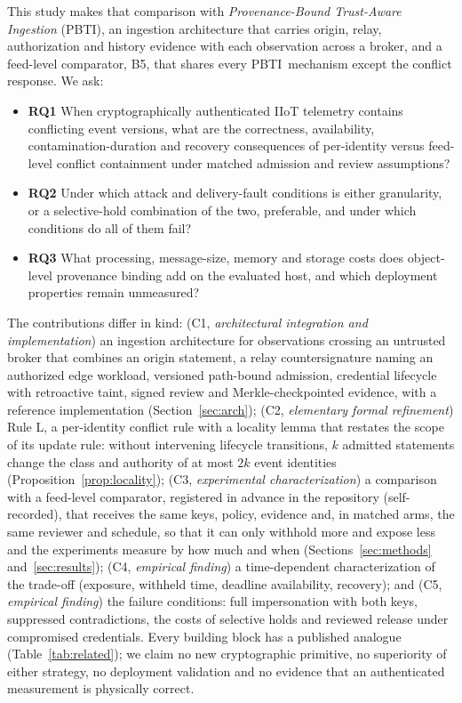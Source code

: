 \documentclass[futureinternet,article,submit,moreauthors]{Definitions/mdpi}
\newcommand{\sys}{PBTI}
\begin{document}
This study makes that comparison with \emph{Provenance-Bound Trust-Aware Ingestion} (\sys), an ingestion architecture that carries origin, relay, authorization and history evidence with each observation across a broker, and a feed-level comparator, B5, that shares every \sys\ mechanism except the conflict response. We ask:
\begin{itemize}
\item[] \textbf{RQ1} When cryptographically authenticated IIoT telemetry contains conflicting event versions, what are the correctness, availability, contamination-duration and recovery consequences of per-identity versus feed-level conflict containment under matched admission and review assumptions?
\item[] \textbf{RQ2} Under which attack and delivery-fault conditions is either granularity, or a selective-hold combination of the two, preferable, and under which conditions do all of them fail?
\item[] \textbf{RQ3} What processing, message-size, memory and storage costs does object-level provenance binding add on the evaluated host, and which deployment properties remain unmeasured?
\end{itemize}

The contributions differ in kind: (C1, \emph{architectural integration and implementation}) an ingestion architecture for observations crossing an untrusted broker that combines an origin statement, a relay countersignature naming an authorized edge workload, versioned path-bound admission, credential lifecycle with retroactive taint, signed review and Merkle-checkpointed evidence, with a reference implementation (Section~\ref{sec:arch}); (C2, \emph{elementary formal refinement}) Rule L, a per-identity conflict rule with a locality lemma that restates the scope of its update rule: without intervening lifecycle transitions, $k$ admitted statements change the class and authority of at most $2k$ event identities (Proposition~\ref{prop:locality}); (C3, \emph{experimental characterization}) a comparison with a feed-level comparator, registered in advance in the repository (self-recorded), that receives the same keys, policy, evidence and, in matched arms, the same reviewer and schedule, so that it can only withhold more and expose less and the experiments measure by how much and when (Sections~\ref{sec:methods} and~\ref{sec:results}); (C4, \emph{empirical finding}) a time-dependent characterization of the trade-off (exposure, withheld time, deadline availability, recovery); and (C5, \emph{empirical finding}) the failure conditions: full impersonation with both keys, suppressed contradictions, the costs of selective holds and reviewed release under compromised credentials. Every building block has a published analogue (Table~\ref{tab:related}); we claim no new cryptographic primitive, no superiority of either strategy, no deployment validation and no evidence that an authenticated measurement is physically correct.
\end{document}
